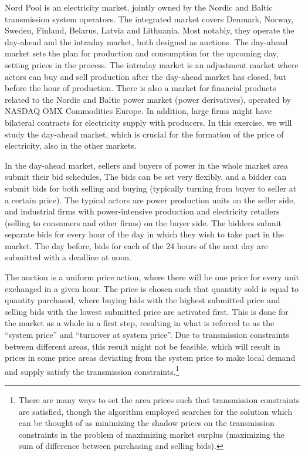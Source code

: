 \documentclass[12pt,a4paper]{article}
\begin{document}
Nord Pool is an electricity market, jointly owned by the Nordic and Baltic transmission system operators. The integrated market covers Denmark, Norway, Sweden, Finland, Belarus, Latvia and Lithuania. Most notably, they operate the day-ahead and the intraday market, both designed as auctions. The day-ahead market sets the plan for production and consumption for the upcoming day, setting prices in the process. The intraday market is an adjustment market where actors can buy and sell production after the day-ahead market has closed, but before the hour of production. There is also a market for financial products related to the Nordic and Baltic power market (power derivatives), operated by NASDAQ OMX Commodities Europe. In addition, large firms might have bilateral contracts for electricity supply with producers. In this exercise, we will study the day-ahead market, which is crucial for the formation of the price of electricity, also in the other markets.

In the day-ahead market, sellers and buyers of power in the whole market area submit their bid schedules, The bids can be set very flexibly, and a bidder can submit bids for both selling and buying (typically turning from buyer to seller at a certain price). The typical actors are power production units on the seller side, and industrial firms with power-intensive production and electricity retailers (selling to consumers and other firms) on the buyer side. The bidders submit separate bids for every hour of the day in which they wish to take part in the market. The day before, bids for each of the 24 hours of the next day are submitted with a deadline at noon.

The auction is a uniform price action, where there will be one price for every unit exchanged in a given hour. The price is chosen such that quantity sold is equal to quantity purchased, where buying bids with the highest submitted price and selling bids with the lowest submitted price are activated first. This is done for the market as a whole in a first step, resulting in what is referred to as the ``system price'' and ``turnover at system price''. Due to transmission constraints between different areas, this result might not be feasible, which will result in prices in some price areas deviating from the system price to make local demand and supply satisfy the transmission constraints.\footnote{There are many ways to set the area prices such that transmission constraints are satisfied, though the algorithm employed searches for the solution which can be thought of as minimizing the shadow prices on the transmission constraints in the problem of maximizing market surplus (maximizing the sum of difference between purchasing and selling bids).}
\end{document}
